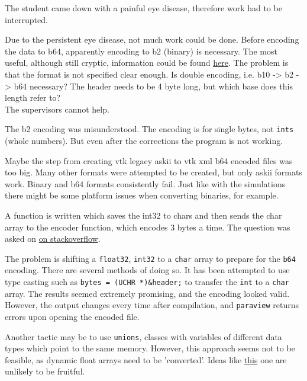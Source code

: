 \bigbreak
{}
The student came down with a painful eye disease, therefore work had to be interrupted.

\bigbreak
{}
Due to the persistent eye disease, not much work could be done. Before encoding the data to b64, apparently encoding to b2 (binary) is necessary. The most useful, although still cryptic, information could be found \href{http://www.earthmodels.org/software\/vtk-and-paraview/vtk-file-formats}{here}.
The problem is that the format is not specified clear enough. Is double encoding, i.e. b10 -> b2 -> b64 necessary? The header needs to be 4 byte long, but which base does this length refer to?\\
The supervisors cannot help.

\bigbreak
{}
The b2 encoding was misunderstood. The encoding is for single bytes, not \texttt{ints} (whole numbers). But even after the corrections the program is not working.

\bigbreak
{}
Maybe the step from creating vtk legacy askii to vtk xml b64 encoded files was too big. Many other formats were attempted to be created, but only askii formats work. Binary and b64 formats consistently fail. Just like with the simulations there might be some platform issues when converting binaries, for example.

\bigbreak
{}
A function is written which saves the int32 to chars and then sends the char array to the encoder function, which encodes 3 bytes a time. The question was asked on  \href{https://stackoverflow.com/questions/57539806/how-do-i-encode-a-float32-to-b64-in-c}{on stackoverflow}.

\bigbreak
{} The problem is shifting a \texttt{float32}, \texttt{int32} to a \texttt{char} array to prepare for the \texttt{b64} encoding. There are several methods of doing so. It has been attempted to use type casting such as \texttt{bytes = (UCHR *)&header;} to transfer the \texttt{int} to a \texttt{char} array. The results seemed extremely promising, and the encoding looked valid. However, the output changes every time after compilation, and \texttt{paraview} returns errors upon opening the encoded file.

\bigbreak
{} Another tactic may be to use \texttt{unions}, classes with variables of different data types which point to the same memory. However, this approach seems not to be feasible, as dynamic float arrays need to be 'converted'. Ideas like \href{https://stackoverflow.com/questions/50087561/initializing-dynamic-array-of-unions-in-c}{this} one are unlikely to be fruitful.

